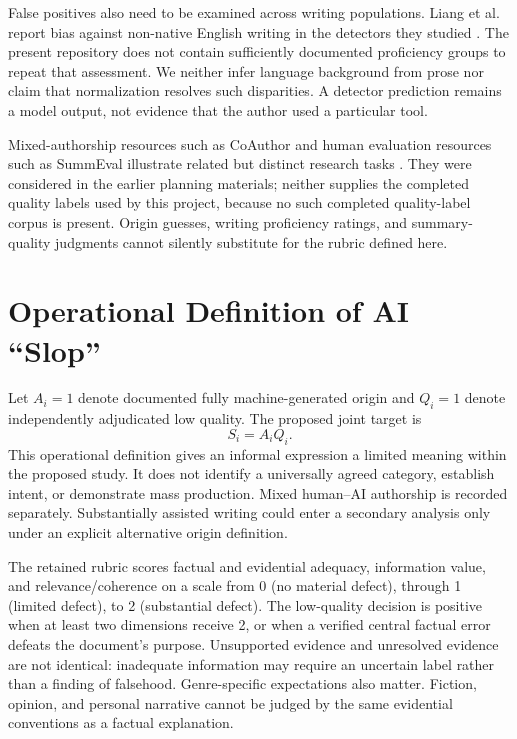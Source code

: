 \documentclass[11pt]{article}
\begin{document}
False positives also need to be examined across writing populations. Liang
et al. report bias against non-native English writing in the detectors they
studied \cite{liang}. The present repository does not contain sufficiently
documented proficiency groups to repeat that assessment. We neither infer
language background from prose nor claim that normalization resolves such
disparities. A detector prediction remains a model output, not evidence that
the author used a particular tool.

Mixed-authorship resources such as CoAuthor and human evaluation resources
such as SummEval illustrate related but distinct research tasks
\cite{coauthor,summeval}. They were considered in the earlier planning
materials; neither supplies the completed quality labels used by this
project, because no such completed quality-label corpus is present. Origin
guesses, writing proficiency ratings, and summary-quality judgments cannot
silently substitute for the rubric defined here.

\section{Operational Definition of AI ``Slop''}
Let $A_i=1$ denote documented fully machine-generated origin and $Q_i=1$
denote independently adjudicated low quality. The proposed joint target is
\begin{equation}
S_i=A_iQ_i.
\label{eq:slop}
\end{equation}
This operational definition gives an informal expression a limited meaning
within the proposed study. It does not identify a universally agreed category,
establish intent, or demonstrate mass production. Mixed human--AI authorship
is recorded separately. Substantially assisted writing could enter a secondary
analysis only under an explicit alternative origin definition.

The retained rubric scores factual and evidential adequacy, information value,
and relevance/coherence on a scale from 0 (no material defect), through 1
(limited defect), to 2 (substantial defect). The low-quality decision is positive
when at least two dimensions receive 2, or when a verified central factual
error defeats the document's purpose. Unsupported evidence and unresolved
evidence are not identical: inadequate information may require an uncertain
label rather than a finding of falsehood. Genre-specific expectations also
matter. Fiction, opinion, and personal narrative cannot be judged by the same
evidential conventions as a factual explanation.
\end{document}
